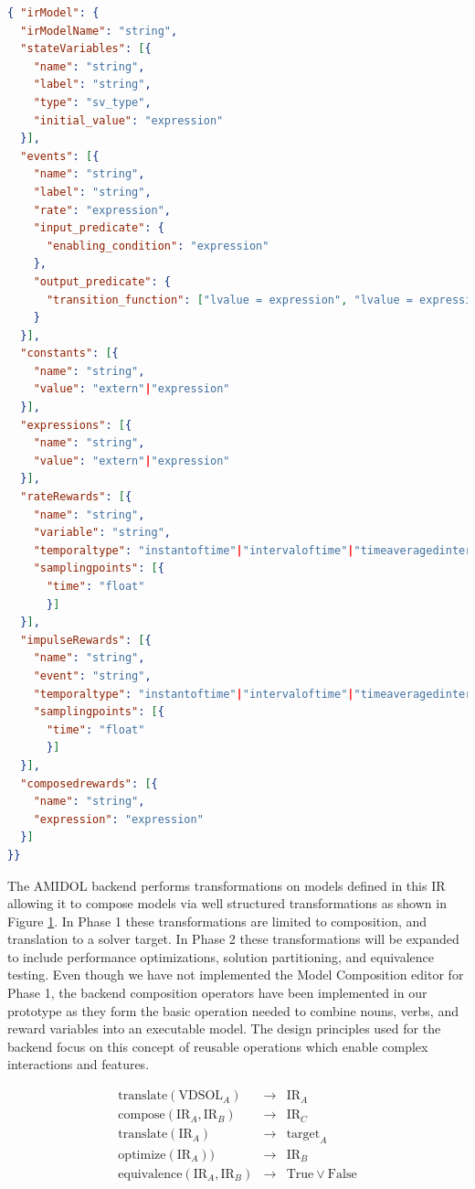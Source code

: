 \documentclass[11pt]{article}
\newcommand{\amidol}{\textsc{AMIDOL}}
\begin{document}
\begin{lstlisting}[language=json, caption=JSON Schema for the AMIDOL Intermediate Representation]
{ "irModel": {
  "irModelName": "string",
  "stateVariables": [{
    "name": "string",
    "label": "string",
    "type": "sv_type",
    "initial_value": "expression"
  }],
  "events": [{
    "name": "string",
    "label": "string",
    "rate": "expression",
    "input_predicate": {
      "enabling_condition": "expression"
    },
    "output_predicate": {
      "transition_function": ["lvalue = expression", "lvalue = expression", ...]
    }
  }],
  "constants": [{
    "name": "string",
    "value": "extern"|"expression"
  }],
  "expressions": [{
    "name": "string",
    "value": "extern"|"expression"
  }],
  "rateRewards": [{
    "name": "string",
    "variable": "string",
    "temporaltype": "instantoftime"|"intervaloftime"|"timeaveragedintervaloftime"|"steadystate",
    "samplingpoints": [{
      "time": "float"
      }]    
  }],
  "impulseRewards": [{
    "name": "string",
    "event": "string",
    "temporaltype": "instantoftime"|"intervaloftime"|"timeaveragedintervaloftime"|"steadystate",
    "samplingpoints": [{
      "time": "float"
      }]    
  }],
  "composedrewards": [{
    "name": "string",
    "expression": "expression"
  }]
}}
\end{lstlisting}

The \amidol{} backend performs transformations on models defined in this IR allowing it to compose models via well structured transformations as shown in Figure \ref{Fig:AMIDOLBackend}.  In Phase 1 these transformations are limited to composition, and translation to a solver target.  In Phase 2 these transformations will be expanded to include performance optimizations, solution partitioning, and equivalence testing.  Even though we have not implemented the Model Composition editor for Phase 1, the backend composition operators have been implemented in our prototype as they form the basic operation needed to combine nouns, verbs, and reward variables into an executable model.  The design principles used for the backend focus on this concept of reusable operations which enable complex interactions and features.

\begin{figure}
  \begin{eqnarray}
    \mathrm{translate}(\mathrm{VDSOL}_A) & \rightarrow & \mathrm{IR}_A\\
    \mathrm{compose}(\mathrm{IR}_A, \mathrm{IR}_B) & \rightarrow & \mathrm{IR}_C\\
    \mathrm{translate}(\mathrm{IR}_A) & \rightarrow & \mathrm{target}_A\\
    \mathrm{optimize}(\mathrm{IR}_A)) & \rightarrow & \mathrm{IR}_B\\
    \mathrm{equivalence}(\mathrm{IR}_A, \mathrm{IR}_B) & \rightarrow & \mathrm{True} \vee \mathrm{False}
  \end{eqnarray}
  \caption{}
  \label{Fig:AMIDOLBackend}
\end{figure}
\end{document}
